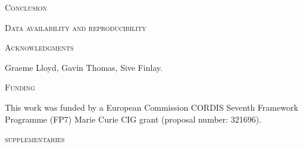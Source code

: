 \documentclass[12pt,letterpaper]{article}
\renewcommand{\section}[1]{%
\bigskip
\begin{center}
\begin{Large}
\normalfont\scshape #1
\medskip
\end{Large}
\end{center}}
\begin{document}
\section{Conclusion}



\section{Data availability and reproducibility}

\section{Acknowledgments}
Graeme Lloyd, Gavin Thomas, Sive Finlay.

\section{Funding} %
This work was funded by a European Commission CORDIS Seventh Framework Programme (FP7) Marie Curie CIG grant (proposal number: 321696).





\section{supplementaries}
\end{document}
